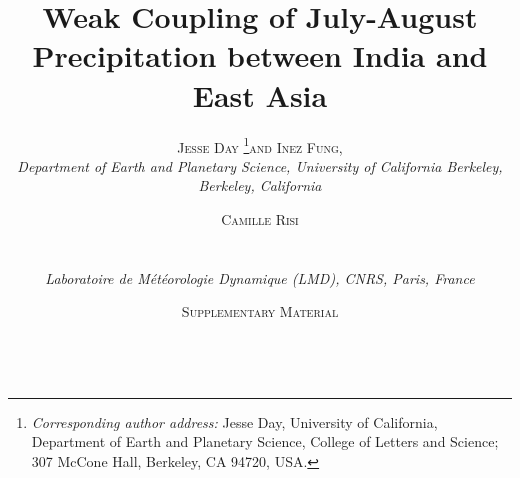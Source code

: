 \documentclass[12pt]{article}
\begin{document}
%
%
\title{\textbf{\large{{Weak Coupling of July-August Precipitation between India and East Asia}}}}
%
%
\author{\textsc{Jesse Day}
				\thanks{\textit{Corresponding author address:} 
				Jesse Day, University of California, Department of Earth and Planetary Science, College of Letters and Science; 307 McCone Hall, Berkeley, CA 94720, USA.
				}\quad\textsc{and Inez Fung,}\\
\textit{\footnotesize{Department of Earth and Planetary Science, University of California Berkeley, Berkeley, California}}
\and 
\centerline{\textsc{Camille Risi}}\\
\centerline{\textit{\footnotesize{Laboratoire de M\'et\'eorologie Dynamique (LMD), CNRS, Paris, France}}}
\and 
\centerline{\textsc{Supplementary Material}}\\
}
%
{
\twocolumn[
\begin{@twocolumnfalse}
\amstitle

\begin{center}
\begin{minipage}{13.0cm}
\begin{abstract}
	\myabstract
	\newline
	\begin{center}
		\rule{38mm}{0.2mm}
	\end{center}
\end{abstract}
\end{minipage}
\end{center}
\end{@twocolumnfalse}
]
}
{
\amstitle
\newpage
}

\pagestyle{plain}

{}
{\clearpage}

\end{document}
